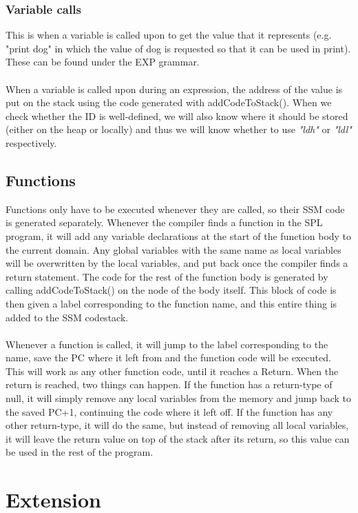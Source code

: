 \documentclass[10pt,a4paper]{article}
\begin{document}
\subsubsection{Variable calls}
This is when a variable is called upon to get the value that it represents (e.g. "print dog" in which the value of dog is requested so that it can be used in print). These can be found under the EXP grammar.\\
\\
When a variable is called upon during an expression, the address of the value is put on the stack using the code generated with addCodeToStack(). When we check whether the ID is well-defined, we will also know where it should be stored (either on the heap or locally) and thus we will know whether to use \textit{"ldh"} or \textit{"ldl"} respectively.

\subsection{Functions}
Functions only have to be executed whenever they are called, so their SSM code is generated separately. Whenever the compiler finds a function in the SPL program, it will add any variable declarations at the start of the function body to the current domain. Any global variables with the same name as local variables will be overwritten by the local variables, and put back once the compiler finds a return statement. The code for the rest of the function body is generated by calling addCodeToStack() on the node of the body itself. This block of code is then given a label corresponding to the function name, and this entire thing is added to the SSM codestack.\\
\\
Whenever a function is called, it will jump to the label corresponding to the name, save the PC where it left from and the function code will be executed. This will work as any other function code, until it reaches a Return. When the return is reached, two things can happen. If the function has a return-type of null, it will simply remove any local variables from the memory and jump back to the saved PC+1, continuing the code where it left off. If the function has any other return-type, it will do the same, but instead of removing all local variables, it will leave the return value on top of the stack after its return, so this value can be used in the rest of the program.


\section{Extension}
\end{document}
